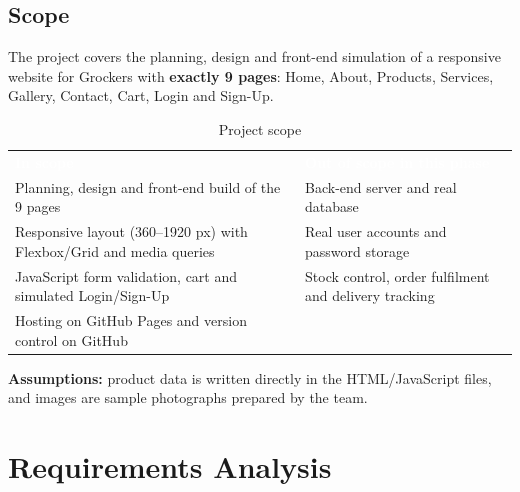 \documentclass[10pt,a4paper]{article}
\newcommand{\hc}[1]{\textcolor{white}{\bfseries #1}}
\newcommand{\tbl}{\rowcolors{2}{white}{gkbg}\renewcommand{\arraystretch}{1.2}\footnotesize}
\begin{document}
\subsection{Scope}
The project covers the planning, design and front-end simulation of a responsive website for Grockers with \textbf{exactly 9 pages}: Home, About, Products, Services, Gallery, Contact, Cart, Login and Sign-Up.

\begin{table}[H]
\centering
\caption{Project scope}\label{tab:scope}
\tbl
\begin{tabularx}{\textwidth}{@{}YY@{}}
\hc{In scope} & \hc{Out of scope in this phase}\\
Planning, design and front-end build of the 9 pages & Back-end server and real database\\
Responsive layout (360--1920 px) with Flexbox/Grid and media queries & Real user accounts and password storage\\
JavaScript form validation, cart and simulated Login/Sign-Up & Stock control, order fulfilment and delivery tracking\\
Hosting on GitHub Pages and version control on GitHub & \\
\end{tabularx}
\end{table}
\textbf{Assumptions:} product data is written directly in the HTML/JavaScript files, and images are sample photographs prepared by the team.

\section{Requirements Analysis}
\end{document}
